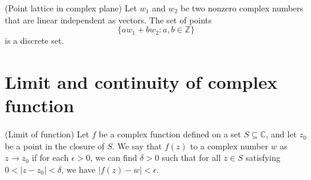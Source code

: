%	
%	
%
%	



\begin{example} (Point lattice in complex plane)
Let $w_1$ and $w_2$ be two nonzero complex numbers that are linear independent as vectors. The set of points
$$
\{aw_1 + bw_2: a,b\in \mathbb{Z}\}
$$
is a discrete set.
\end{example}





\section{Limit and continuity of complex function}



\begin{svgraybox}
	\begin{definition} (Limit of function)  
		 Let $f$ be a complex function defined on a set $S \subseteq \mathbb{C}$, and let $z_0$ be a point in the closure of $S$. We say that $f(z)$  to a complex number $w$ as $z\rightarrow z_0$ if  for each $\epsilon>0$, we can find $\delta>0$ such that for all
		$
		z\in S$ satisfying  $0<|z-z_0|< \delta$, we have $|f(z)-w| <\epsilon$.
	\end{definition}
\end{svgraybox}

